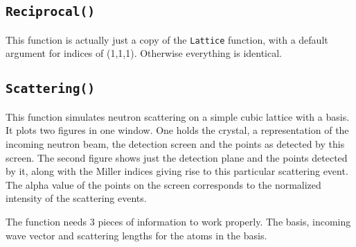 \documentclass[a4paper,11pt]{article}
\numberwithin{equation}{section}
\begin{document}
	\subsection{\texorpdfstring{\texttt{Reciprocal()}}{Reciprocal}}
	This function is actually just a copy of the \texttt{Lattice} function, with a default argument for indices of (1,1,1). Otherwise everything is identical.
	
	\subsection{\texorpdfstring{\texttt{Scattering()}}{Scattering}}
	This function simulates neutron scattering on a simple cubic lattice with a basis. It plots two figures in one window. One holds the crystal, a representation of the incoming neutron beam, the detection screen and the points as detected by this screen. The second figure shows just the detection plane and the points detected by it, along with the Miller indices giving rise to this particular scattering event. The alpha value of the points on the screen corresponds to the normalized intensity of the scattering events.
	
	The function needs 3 pieces of information to work properly. The basis, incoming wave vector and scattering lengths for the atoms in the basis.
	
\end{document}
